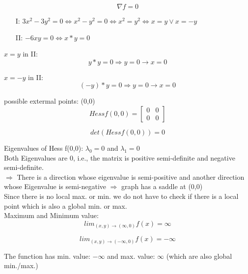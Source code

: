 \documentclass[12pt]{article}
\begin{document}
        $$ \nabla f = 0 $$
         
        \begin{enumerate}
         	\item[I:] $ 3x^2-3y^2=0 \Leftrightarrow x^2-y^2=0 \Leftrightarrow x^2=y^2 \Leftrightarrow x=y \vee x=-y $
         	\item[II:] $ -6xy=0 \Leftrightarrow x*y=0 $
        \end{enumerate}
        
        $x=y$ in II:\\
        $$ y*y = 0 \Rightarrow y = 0 \rightarrow x = 0 $$
        
		$x=-y$ in II:\\
        $$ (-y)*y = 0 \Rightarrow y = 0 \rightarrow x = 0 $$
        
        possible extermal points: (0,0)\\
        
        $$ Hess f(0,0) = \begin{bmatrix} 0 & 0 \\ 0 & 0 \end{bmatrix} $$
        
        $$ det (Hess f(0,0)) = 0 $$
        
        Eigenvalues of Hess f(0,0): $\lambda_0=0$ and $\lambda_1=0$\\
        
        Both Eigenvalues are 0, i.e., the matrix is positive semi-definite and negative semi-definite. \\
        
        $\Rightarrow$ There is a direction whose eigenvalue is semi-positive and another direction whose Eigenvalue is semi-negative $\Rightarrow$ graph has a saddle at (0,0)\\
        
        Since there is no local max. or min. we do not have to check if there is a local point which is also a global min. or max.\\
        
        Maximum and Minimum value:\\
        
        $$ lim_{(x,y)\rightarrow (\infty,0)}f(x)= \infty $$
        
        $$ lim_{(x,y)\rightarrow (-\infty,0)}f(x)= -\infty $$
        
        The function has min. value: $-\infty$ and max. value: $\infty$ (which are also global min./max.)
        
\end{document}
